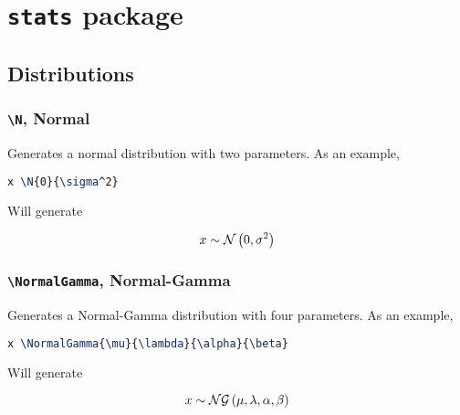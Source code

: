 \documentclass[]{article}
\title{}
\author{}
\begin{document}
\maketitle

\begin{abstract}

\end{abstract}

\section{\texttt{stats} package}

\subsection{Distributions}

\subsubsection{\texttt{\textbackslash N}, Normal}

Generates a normal distribution with two parameters.
As an example,

\begin{lstlisting}[language=TeX]
x \N{0}{\sigma^2}
\end{lstlisting}

Will generate

\[ x \sim \mathcal{N} \left( 0,\sigma^2 \right) \]

\subsubsection{\texttt{\textbackslash NormalGamma}, Normal-Gamma}

Generates a Normal-Gamma distribution with four parameters.
As an example,

\begin{lstlisting}[language=TeX]
x \NormalGamma{\mu}{\lambda}{\alpha}{\beta}
\end{lstlisting}

Will generate

\[ x \sim \mathcal{NG} \left(\mu,\lambda,\alpha,\beta\right) \]
\end{document}
